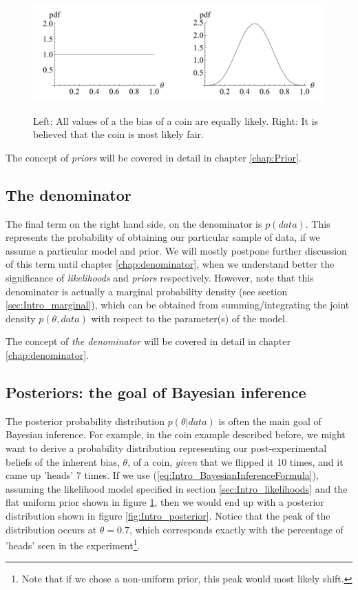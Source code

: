 \documentclass[11pt,fullpage]{book}
\begin{document}
\begin{figure}
\centering
\scalebox{0.6} 
{\includegraphics{Intro_priors.pdf}}
\caption{Left: All values of a the bias of a coin are equally likely. Right: It is believed that the coin is most likely fair.}\label{fig:Intro_priors}
\end{figure}

The concept of \textit{priors} will be covered in detail in chapter \ref{chap:Prior}.

\subsection{The denominator}
The final term on the right hand side, on the denominator is $p(data)$. This represents the probability of obtaining our particular sample of data, if we assume a particular model and prior. We will mostly postpone further discussion of this term until chapter \ref{chap:denominator}, when we understand better the significance of \textit{likelihoods} and \textit{priors} respectively. However, note that this denominator is actually a marginal probability density (see section \ref{sec:Intro_marginal}), which can be obtained from summing/integrating the joint density $p(\theta,data)$ with respect to the parameter(s) of the model.

The concept of \textit{the denominator} will be covered in detail in chapter \ref{chap:denominator}.

\subsection{Posteriors: the goal of Bayesian inference}
The posterior probability distribution $p(\theta|data)$ is often the main goal of Bayesian inference. For example, in the coin example described before, we might want to derive a probability distribution representing our post-experimental beliefs of the inherent bias, $\theta$, of a coin, \textit{given} that we flipped it 10 times, and it came up 'heads' 7 times. If we use (\ref{eq:Intro_BayesianInferenceFormula}), assuming the likelihood model specified in section \ref{sec:Intro_likelihoods} and the flat uniform prior shown in figure \ref{fig:Intro_priors}, then we would end up with a posterior distribution shown in figure \ref{fig:Intro_posterior}. Notice that the peak of the distribution occurs at $\theta=0.7$, which corresponds exactly with the percentage of 'heads' seen in the experiment\footnote{Note that if we chose a non-uniform prior, this peak would most likely shift.}. 
\end{document}
